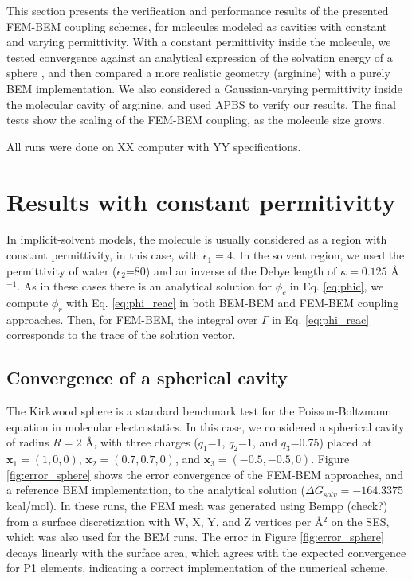 This section presents the verification and performance results of the presented FEM-BEM coupling schemes, for molecules modeled as cavities with constant and varying permittivity.
With a constant permittivity inside the molecule, we tested convergence against an analytical expression of the solvation energy of a sphere \cite{Kirkwood1934}, and then compared a more realistic geometry (arginine) with a purely BEM implementation.
We also considered a Gaussian-varying permittivity\cite{grant2001smooth,li2013dielectric} inside the molecular cavity of arginine, and used APBS \cite{BakerETal2001} to verify our results.
The final tests show the scaling of the FEM-BEM coupling, as the molecule size grows. 

All runs were done on XX computer with YY specifications. 

\section*{\sffamily \Large Results with constant permitivitty}

In implicit-solvent models, the molecule is usually considered as a region with constant permittivity, in this case, with $\epsilon_1=4$.
In the solvent region, we used the permittivity of water ($\epsilon_2$=80) and an inverse of the Debye length of $\kappa=0.125$ \AA$^{-1}$.
As in these cases there is an analytical solution for $\phi_c$ in Eq. \eqref{eq:phic}, we compute $\phi_r$ with Eq. \eqref{eq:phi_reac} in both BEM-BEM and FEM-BEM coupling approaches. Then, for FEM-BEM, the integral over $\Gamma$ in Eq. \eqref{eq:phi_reac} corresponds to the trace of the solution vector.

\subsection*{\sffamily \large Convergence of a spherical cavity}

The Kirkwood sphere \cite{Kirkwood1934} is a standard benchmark test for the Poisson-Boltzmann equation in molecular electrostatics. 
In this case, we considered a spherical cavity of radius $R=2$ \AA, with three charges ($q_1$=1, $q_2$=1, and $q_3$=0.75) placed at $\mathbf{x}_1=(1,0,0)$, $\mathbf{x}_2=(0.7,0.7,0)$, and $\mathbf{x}_3=(-0.5,-0.5,0)$.
Figure \ref{fig:error_sphere} shows the error convergence of the FEM-BEM approaches, and a reference BEM implementation, to the analytical solution ($\Delta G_{solv}= -164.3375$ kcal/mol). 
In these runs, the FEM mesh was generated using Bempp (check?) from a surface discretization with W, X, Y, and Z vertices per \AA$^2$ on the SES, which was also used for the BEM runs. 
The error in Figure \ref{fig:error_sphere} decays linearly with the surface area, which agrees with the expected convergence for P1 elements, indicating a correct implementation of the numerical scheme. 

